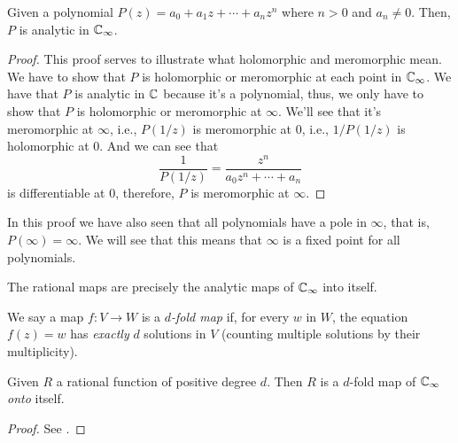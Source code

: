 \begin{proposition}
    Given a polynomial $P(z) = a_0 + a_1 z + \cdots + a_n z^n$ where $n > 0$ and
    $a_n \neq 0$. Then, $P$ is analytic in $\mathbb{C}_\infty$.
\end{proposition}
\begin{proof}
    This proof serves to illustrate what holomorphic and meromorphic mean. We
    have to show that $P$ is holomorphic or meromorphic at each point in
    $\mathbb{C}_\infty$. We have that $P$ is analytic in $\mathbb{C}$ because it's a polynomial,
    thus, we only have to show that $P$ is holomorphic or meromorphic at
    $\infty$. We'll see that it's meromorphic at $\infty$, i.e., $P(1/z)$ is
    meromorphic at $0$, i.e., $1/P(1/z)$ is holomorphic at $0$. And we can see
    that
    \begin{equation*}
        \frac{1}{P(1/z)} = \frac{z^n}{a_0 z^n + \cdots + a_n}
    \end{equation*}
    is differentiable at $0$, therefore, $P$ is meromorphic at $\infty$.
\end{proof}

In this proof we have also seen that all polynomials have a pole in $\infty$,
that is, $P(\infty) = \infty$. We will see that this means that $\infty$ is a
fixed point for all polynomials.

\begin{theorem}
    The rational maps are precisely the analytic maps of $\mathbb{C}_\infty$ into itself.
\end{theorem}

\begin{definition}
    We say a map $f: V \to W$ is a \emph{$d$-fold map} if, for every $w$ in $W$,
    the equation $f(z) = w$ has \emph{exactly} $d$ solutions in $V$ (counting
    multiple solutions by their multiplicity).
\end{definition}

\begin{theorem}
    \label{thm:rational_map_are_dfold_maps}
    Given $R$ a rational function of positive degree $d$. Then $R$ is a $d$-fold
    map of $\mathbb{C}_\infty$ \emph{onto} itself.
\end{theorem}
\begin{proof}
    See \cite[31--32]{Beardon1991}.
\end{proof}

